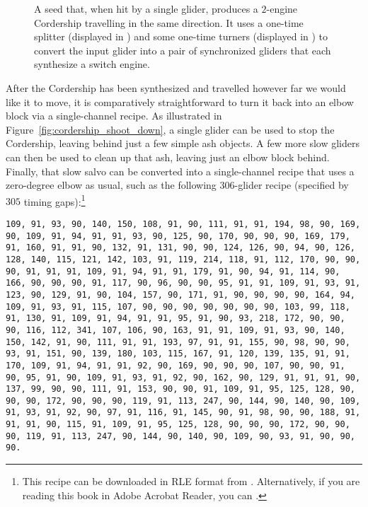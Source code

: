 \begin{figure}[!htb]
	\centering
	
	\caption{A seed that, when hit by a single glider, produces a $2$-engine Cordership travelling in the same direction. It uses a one-time splitter (displayed in ) and some one-time turners (displayed in ) to convert the input glider into a pair of synchronized gliders that each synthesize a switch engine.}\label{fig:2_engine_cordership_seed}
\end{figure}

After the Cordership has been synthesized and travelled however far we would like it to move, it is comparatively straightforward to turn it back into an elbow block via a single-channel recipe. As illustrated in Figure~\ref{fig:cordership_shoot_down}, a single glider can be used to stop the Cordership, leaving behind just a few simple ash objects. A few more slow gliders can then be used to clean up that ash, leaving just an elbow block behind. Finally, that slow salvo can be converted into a single-channel recipe that uses a zero-degree elbow as usual, such as the following $306$-glider recipe (specified by $305$ timing gaps):\footnote{This recipe can be downloaded in RLE format from . \ifdefined\FORPRINTING\else Alternatively, if you are reading this book in Adobe Acrobat Reader, you can .\fi}\\[-0.1cm]

\begin{sloppypar}
	\noindent\texttt{\footnotesize 109, 91, 93, 90, 140, 150, 108, 91, 90, 111, 91, 91, 194, 98, 90, 169, 90, 109, 91, 94, 91, 91, 93, 90, 125, 90, 170, 90, 90, 90, 169, 179, 91, 160, 91, 91, 90, 132, 91, 131, 90, 90, 124, 126, 90, 94, 90, 126, 128, 140, 115, 121, 142, 103, 91, 119, 214, 118, 91, 112, 170, 90, 90, 90, 91, 91, 91, 109, 91, 94, 91, 91, 179, 91, 90, 94, 91, 114, 90, 166, 90, 90, 90, 91, 117, 90, 96, 90, 90, 95, 91, 91, 109, 91, 93, 91, 123, 90, 129, 91, 90, 104, 157, 90, 171, 91, 90, 90, 90, 90, 164, 94, 109, 91, 93, 91, 115, 107, 90, 90, 90, 90, 90, 90, 90, 103, 99, 118, 91, 130, 91, 109, 91, 94, 91, 91, 95, 91, 90, 93, 218, 172, 90, 90, 90, 116, 112, 341, 107, 106, 90, 163, 91, 91, 109, 91, 93, 90, 140, 150, 142, 91, 90, 111, 91, 91, 193, 97, 91, 91, 155, 90, 98, 90, 90, 93, 91, 151, 90, 139, 180, 103, 115, 167, 91, 120, 139, 135, 91, 91, 170, 109, 91, 94, 91, 91, 92, 90, 169, 90, 90, 90, 107, 90, 90, 91, 90, 95, 91, 90, 109, 91, 93, 91, 92, 90, 162, 90, 129, 91, 91, 91, 90, 137, 99, 90, 90, 111, 91, 153, 90, 90, 91, 109, 91, 95, 125, 128, 90, 90, 90, 172, 90, 90, 90, 119, 91, 113, 247, 90, 144, 90, 140, 90, 109, 91, 93, 91, 92, 90, 97, 91, 116, 91, 145, 90, 91, 98, 90, 90, 188, 91, 91, 91, 90, 115, 91, 109, 91, 95, 125, 128, 90, 90, 90, 172, 90, 90, 90, 119, 91, 113, 247, 90, 144, 90, 140, 90, 109, 90, 93, 91, 90, 90, 90.}
\end{sloppypar}

